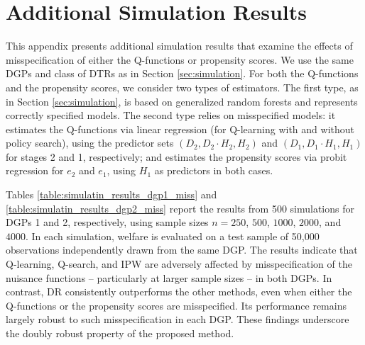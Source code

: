 \setcounter{equation}{0}
\setcounter{table}{0}
\renewcommand{\theequation}{\Alph{section}.\arabic{equation}}
\renewcommand{\thetable}{\Alph{section}.\arabic{table}}

\section{Additional Simulation Results}
\label{app:additional_simulation_results}

This appendix presents additional simulation results that examine the effects of misspecification of either the Q-functions or propensity scores. We use the same DGPs and class of DTRs as in Section \ref{sec:simulation}. For both the Q-functions and the propensity scores, we consider two types of estimators. The first type, as in Section \ref{sec:simulation}, is based on generalized random forests \citep{Athey_et_al_2019} and represents correctly specified models. The second type relies on misspecified models: it estimates the Q-functions via linear regression (for Q-learning with and without policy search), using the predictor sets $(D_2, D_2 \cdot H_2, H_2)$ and $(D_1, D_1\cdot H_1, H_1)$ for stages 2 and 1, respectively; and estimates the propensity scores via probit regression for $e_2$ and $e_1$, using $H_1$ as predictors in both cases.


Tables \ref{table:simulatin_results_dgp1_miss} and \ref{table:simulatin_results_dgp2_miss} report the results from 500 simulations for DGPs 1 and 2, respectively, using sample sizes $n = 250$, $500$, $1000$, $2000$, and $4000$. In each simulation, welfare is evaluated on a test sample of 50,000 observations independently drawn from the same DGP.
The results indicate that Q-learning, Q-search, and IPW are adversely affected by misspecification of the nuisance functions -- particularly at larger sample sizes -- in both DGPs. In contrast, DR consistently outperforms the other methods, even when either the Q-functions or the propensity scores are misspecified. Its performance remains largely robust to such misspecification in each DGP. These findings underscore the doubly robust property of the proposed method.
\medskip




\medskip